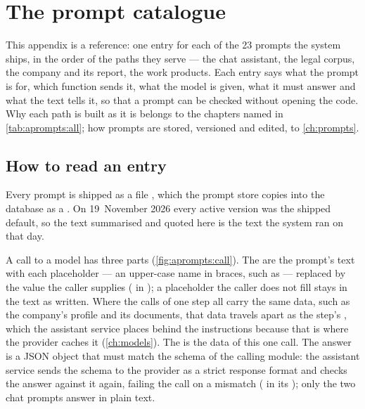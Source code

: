 \chapter{The prompt catalogue}\label{app:prompts}

\providecommand{\apromptsfield}[1]{\par\addvspace{.5\baselineskip}\noindent{\sffamily\bfseries\color{ink}#1}\enspace\ignorespaces}
\providecommand{\apromptsneed}[1]{\par\begingroup\dimen0=#1\baselineskip\dimen2=\pagegoal\advance\dimen2 by -\pagetotal\ifdim\dimen0>\dimen2\ifdim\dimen2>0pt\vfil\fi\penalty-10000\fi\endgroup}

This appendix is a reference: one entry for each of the 23 prompts the system ships, in the
order of the paths they serve --- the chat assistant, the legal corpus, the company and its
report, the work products. Each entry says what the prompt is for, which function sends it,
what the model is given, what it must answer and what the text tells it, so that a prompt can
be checked without opening the code. Why each path is built as it is belongs to the chapters
named in \cref{tab:aprompts:all}; how prompts are stored, versioned and edited, to
\cref{ch:prompts}.

\section{How to read an entry}\label{sec:aprompts:reading}

Every prompt is shipped as a file , which the prompt store
copies into the database as a . On 19~November 2026 every active version
was the shipped default, so the text summarised and quoted here is the text the system ran on
that day.

A call to a model has three parts (\cref{fig:aprompts:call}). The  are the
prompt's text with each placeholder --- an upper-case name in braces, such as
 --- replaced by the value the caller supplies ( in
); a placeholder the caller does not fill stays in the text as written.
Where the calls of one step all carry the same data, such as the company's profile and its
documents, that data travels apart as the step's , which the assistant
service places behind the instructions because that is where the provider caches it
(\cref{ch:models}). The  is the data of this one call. The answer is a JSON
object that must match the schema of the calling module: the assistant service sends the
schema to the provider as a strict response format and checks the answer against it again,
failing the call on a mismatch ( in its ); only
the two chat prompts answer in plain text.


